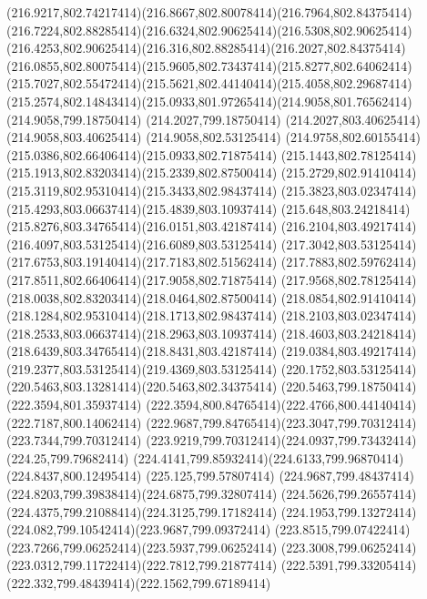 {{	\curveto(216.9217,802.74217414)(216.8667,802.80078414)(216.7964,802.84375414)
	\curveto(216.7224,802.88285414)(216.6324,802.90625414)(216.5308,802.90625414)
	\curveto(216.4253,802.90625414)(216.316,802.88285414)(216.2027,802.84375414)
	\curveto(216.0855,802.80075414)(215.9605,802.73437414)(215.8277,802.64062414)
	\curveto(215.7027,802.55472414)(215.5621,802.44140414)(215.4058,802.29687414)
	\curveto(215.2574,802.14843414)(215.0933,801.97265414)(214.9058,801.76562414)
	\lineto(214.9058,799.18750414)
	\lineto(214.2027,799.18750414)
	\lineto(214.2027,803.40625414)
	\lineto(214.9058,803.40625414)
	\lineto(214.9058,802.53125414)
	\curveto(214.9758,802.60155414)(215.0386,802.66406414)(215.0933,802.71875414)
	\curveto(215.1443,802.78125414)(215.1913,802.83203414)(215.2339,802.87500414)
	\curveto(215.2729,802.91410414)(215.3119,802.95310414)(215.3433,802.98437414)
	\curveto(215.3823,803.02347414)(215.4293,803.06637414)(215.4839,803.10937414)
	\curveto(215.648,803.24218414)(215.8276,803.34765414)(216.0151,803.42187414)
	\curveto(216.2104,803.49217414)(216.4097,803.53125414)(216.6089,803.53125414)
	\curveto(217.3042,803.53125414)(217.6753,803.19140414)(217.7183,802.51562414)
	\curveto(217.7883,802.59762414)(217.8511,802.66406414)(217.9058,802.71875414)
	\curveto(217.9568,802.78125414)(218.0038,802.83203414)(218.0464,802.87500414)
	\curveto(218.0854,802.91410414)(218.1284,802.95310414)(218.1713,802.98437414)
	\curveto(218.2103,803.02347414)(218.2533,803.06637414)(218.2963,803.10937414)
	\curveto(218.4603,803.24218414)(218.6439,803.34765414)(218.8431,803.42187414)
	\curveto(219.0384,803.49217414)(219.2377,803.53125414)(219.4369,803.53125414)
	\curveto(220.1752,803.53125414)(220.5463,803.13281414)(220.5463,802.34375414)
	\lineto(220.5463,799.18750414)
	\closepath
	\moveto(222.3594,801.35937414)
	\curveto(222.3594,800.84765414)(222.4766,800.44140414)(222.7187,800.14062414)
	\curveto(222.9687,799.84765414)(223.3047,799.70312414)(223.7344,799.70312414)
	\curveto(223.9219,799.70312414)(224.0937,799.73432414)(224.25,799.79682414)
	\curveto(224.4141,799.85932414)(224.6133,799.96870414)(224.8437,800.12495414)
	\lineto(225.125,799.57807414)
	\curveto(224.9687,799.48437414)(224.8203,799.39838414)(224.6875,799.32807414)
	\curveto(224.5626,799.26557414)(224.4375,799.21088414)(224.3125,799.17182414)
	\curveto(224.1953,799.13272414)(224.082,799.10542414)(223.9687,799.09372414)
	\curveto(223.8515,799.07422414)(223.7266,799.06252414)(223.5937,799.06252414)
	\curveto(223.3008,799.06252414)(223.0312,799.11722414)(222.7812,799.21877414)
	\curveto(222.5391,799.33205414)(222.332,799.48439414)(222.1562,799.67189414)
}}
